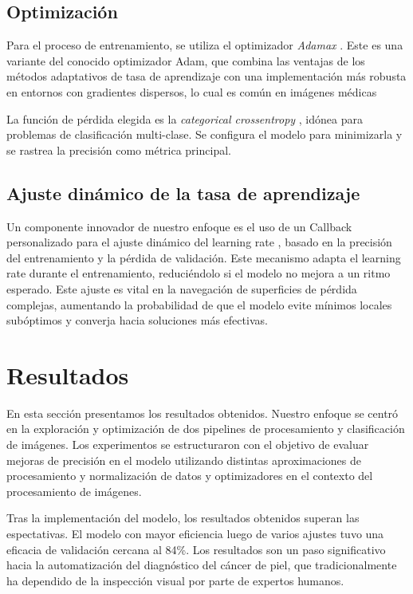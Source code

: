 \subsection{Optimización}

Para el proceso de entrenamiento, se utiliza el optimizador \textit{Adamax} . Este es una variante del conocido optimizador Adam, que combina las ventajas de los métodos adaptativos de tasa de aprendizaje con una implementación más robusta en entornos con gradientes dispersos, lo cual es común en imágenes médicas 

La función de pérdida elegida es la \textit{categorical crossentropy} , idónea para problemas de clasificación multi-clase. Se configura el modelo para minimizarla y se rastrea la precisión como métrica principal.

\subsection{Ajuste dinámico de la tasa de aprendizaje}

Un componente innovador de nuestro enfoque es el uso de un Callback personalizado para el ajuste dinámico del learning rate , basado en la precisión del entrenamiento y la pérdida de validación. Este mecanismo adapta el learning rate durante el entrenamiento, reduciéndolo si el modelo no mejora a un ritmo esperado. Este ajuste es vital en la navegación de superficies de pérdida complejas, aumentando la probabilidad de que el modelo evite mínimos locales subóptimos y converja hacia soluciones más efectivas.

\section{Resultados}\label{sec:results}

En esta sección presentamos los resultados obtenidos. Nuestro enfoque se centró en la exploración y optimización de dos pipelines de procesamiento y clasificación de imágenes. Los experimentos se estructuraron con el objetivo de evaluar mejoras de precisión en el modelo utilizando distintas aproximaciones de procesamiento y normalización de datos y optimizadores en el contexto del procesamiento de imágenes.

Tras la implementación del modelo, los resultados obtenidos superan las espectativas. El modelo con mayor eficiencia luego de varios ajustes tuvo una eficacia de validación cercana al 84\%. Los resultados son un paso significativo hacia la automatización del diagnóstico del cáncer de piel, que tradicionalmente ha dependido de la inspección visual por parte de expertos humanos. 

